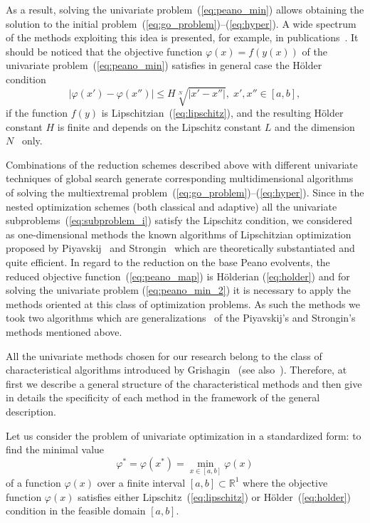 \documentclass[preprint]{elsarticle}
\begin{document}
As a result, solving the univariate problem~(\ref{eq:peano_min}) allows obtaining the solution to the initial problem~(\ref{eq:go_problem})--(\ref{eq:hyper}). A wide spectrum of the methods exploiting this idea is presented, for example, in publications~\cite{bib5,bib29,bib40,bib43,bib44,bib45,bib47}. It should be noticed that the objective function $\varphi(x) = f(y(x))$ of the univariate problem~(\ref{eq:peano_min}) satisfies in general case the H\"older condition
\begin{equation}
  \label{eq:holder}
  | \varphi(x') - \varphi(x'') | \leq H \sqrt[N]{|x' - x''|}, \; x', x'' \in [a, b],
\end{equation}
%
if the function $f(y)$ is Lipschitzian~(\ref{eq:lipschitz}), and the resulting H\"older constant $H$ is finite and depends on the Lipschitz
constant $L$ and the dimension $N$~\cite{bib5,bib51} only.


Combinations of the reduction schemes described above with different univariate techniques of global search generate corresponding multidimensional algorithms of solving the multiextremal problem~(\ref{eq:go_problem})--(\ref{eq:hyper}). Since in the nested optimization schemes (both classical and adaptive) all the univariate subproblems~(\ref{eq:subproblem_i}) satisfy the Lipschitz condition, we considered as one-dimensional methods the known algorithms of Lipschitzian optimization proposed by Piyavskij~\cite{bib26} and Strongin~\cite{bib15} which are theoretically substantiated and quite efficient. In regard to the reduction on the base Peano evolvents, the reduced objective function~(\ref{eq:peano_map}) is H\"olderian (\ref{eq:holder}) and for solving the univariate problem (\ref{eq:peano_min_2}) it is necessary to apply the methods oriented at this class of optimization problems. As such the methods we took two algorithms which are generalizations~\cite{bib5,bib29} of the Piyavskij's and Strongin's methods mentioned above.

All the univariate methods chosen for our research belong to the class of characteristical algorithms introduced by Grishagin~\cite{bib50} (see also~\cite{bib49}). Therefore, at first we describe a general structure of the characteristical methods and then give in details the specificity of each method in the framework of the general description.

Let us consider the problem of univariate optimization in a standardized form: to find the minimal value
\begin{equation}
  \label{eq:univariate}
  \varphi^* = \varphi(x^*) = \min_{x \in [a, b]} \varphi(x)
\end{equation}
%
of a function $\varphi(x)$ over a finite interval $[a, b] \subset \mathbb{R}^1$ where the objective function $\varphi(x)$ satisfies either Lipschitz~(\ref{eq:lipschitz}) or H\"older~(\ref{eq:holder}) condition in the feasible domain $[a,b]$.
\end{document}
